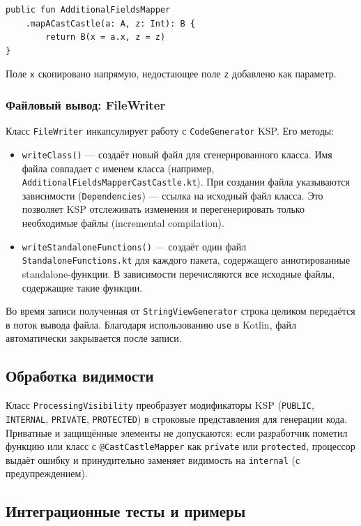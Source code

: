 \begin{lstlisting}
public fun AdditionalFieldsMapper
    .mapACastCastle(a: A, z: Int): B {
        return B(x = a.x, z = z)
}
\end{lstlisting}
Поле \texttt{x} скопировано напрямую, недостающее поле \texttt{z} добавлено как параметр.

\subsubsection{Файловый вывод: FileWriter}

Класс \texttt{FileWriter} инкапсулирует работу с \texttt{CodeGenerator} KSP. Его методы:

\begin{itemize}
    \item \texttt{writeClass()} — создаёт новый файл для сгенерированного класса. Имя файла совпадает с именем класса (например, \texttt{AdditionalFieldsMapperCastCastle.kt}). При создании файла указываются зависимости (\texttt{Dependencies}) — ссылка на исходный файл класса. Это позволяет KSP отслеживать изменения и перегенерировать только необходимые файлы (incremental compilation).
    \item \texttt{writeStandaloneFunctions()} — создаёт один файл \texttt{StandaloneFunctions.kt} для каждого пакета, содержащего аннотированные standalone-функции. В зависимости перечисляются все исходные файлы, содержащие такие функции.
\end{itemize}

Во время записи полученная от \texttt{StringViewGenerator} строка целиком передаётся в поток вывода файла. Благодаря использованию \texttt{use} в Kotlin, файл автоматически закрывается после записи.

\subsection{Обработка видимости}

Класс \texttt{ProcessingVisibility} преобразует модификаторы KSP (\texttt{PUBLIC}, \texttt{INTERNAL}, \texttt{PRIVATE}, \texttt{PROTECTED}) в строковые представления для генерации кода. Приватные и защищённые элементы не допускаются: если разработчик пометил функцию или класс с \texttt{@CastCastleMapper} как \texttt{private} или \texttt{protected}, процессор выдаёт ошибку и принудительно заменяет видимость на \texttt{internal} (с предупреждением).

\subsection{Интеграционные тесты и примеры}

